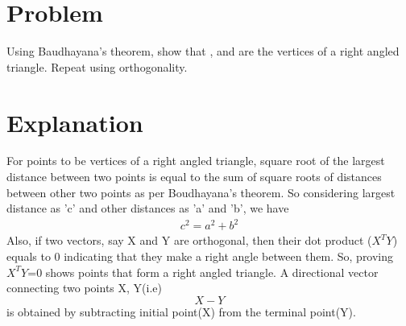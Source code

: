 \documentclass[journal,12pt,twocolumn]{IEEEtran}
\begin{document}
\section{Problem}
Using Baudhayana's theorem, show that ,  and  are the vertices of a right angled triangle. Repeat using orthogonality.  
\section{Explanation}\label{Explanation}
For points to be vertices of a right angled triangle, square root of the largest distance between two points is equal to the sum of square roots of distances between other two points as per Boudhayana's theorem. 
So considering largest distance as 'c' and other distances as 'a' and 'b', we have 
\begin{align}
c^2 = a^2  + b^2
\end{align}
Also, if two vectors, say X  and Y are orthogonal, then their dot product ($X^TY$) equals to 0 indicating that they make a right angle between them. 
So, proving $X^TY$=0 shows points that form a right angled triangle. 
A directional vector connecting two points X, Y(i.e) $$X-Y$$ is obtained by subtracting initial point(X) from the terminal point(Y). 
\end{document}
